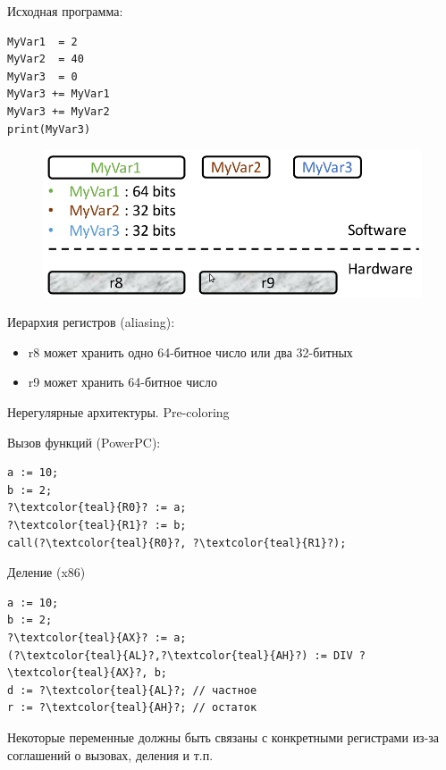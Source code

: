 \documentclass[aspectratio=169
  , xcolor={svgnames}
  , hyperref={ colorlinks,citecolor=DeepPink4
             , linkcolor=DarkRed,urlcolor=DarkBlue}
  , russian
  ]{beamer}
\theoremstyle{exerciseStyle1}
\begin{document}
\begin{frame}[fragile]{}
\begin{minipage}{.48\textwidth}
Исходная программа:
\begin{verbatim}
MyVar1  = 2
MyVar2  = 40
MyVar3  = 0
MyVar3 += MyVar1
MyVar3 += MyVar2
print(MyVar3)
\end{verbatim}
\end{minipage}
\begin{minipage}{.48\textwidth}
\begin{figure}
\centering
\includegraphics[width=1\linewidth]{figures/regalloc-demo2}
\end{figure}
\vspace{1cm}
Иерархия регистров (aliasing):
\begin{itemize}
\item  r8 может хранить одно 64-битное число или два 32-битных
\item  r9 может хранить 64-битное число
\end{itemize}
\end{minipage}
\end{frame}


\begin{frame}[fragile]{Нерегулярные архитектуры. Pre-coloring}
\begin{minipage}{.48\textwidth}
Вызов функций (PowerPC):
\begin{verbatim}
a := 10;
b := 2;
?\textcolor{teal}{R0}? := a;
?\textcolor{teal}{R1}? := b;
call(?\textcolor{teal}{R0}?, ?\textcolor{teal}{R1}?);
\end{verbatim}
\end{minipage}
\begin{minipage}{.48\textwidth}
Деление (x86)
\begin{verbatim}
a := 10;
b := 2;
?\textcolor{teal}{AX}? := a;
(?\textcolor{teal}{AL}?,?\textcolor{teal}{AH}?) := DIV ?\textcolor{teal}{AX}?, b;
d := ?\textcolor{teal}{AL}?; // частное
r := ?\textcolor{teal}{AH}?; // остаток
\end{verbatim}
\end{minipage}
\vspace{1em}

Некоторые переменные должны быть связаны с конкретными регистрами из-за соглашений о вызовах, деления и т.п.
\end{frame}
\end{document}
